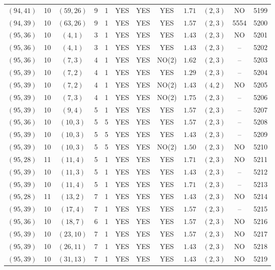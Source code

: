 \begin{longtable}{|c|c|c|c|c|c|c|c|c|c|c|c|}
$(94,41)$ & 10 & $(59,26)$ & 9 & 1 & YES & YES & YES & $1.71$ & $(2,3)$ & NO & 5199\\
$(94,39)$ & 10 & $(63,26)$ & 9 & 1 & YES & YES & YES & $1.57$ & $(2,3)$ & 5554 & 5200\\
$(95,36)$ & 10 & $(4,1)$ & 3 & 1 & YES & YES & YES & $1.43$ & $(2,3)$ & NO & 5201\\
$(95,36)$ & 10 & $(4,1)$ & 3 & 1 & YES & YES & YES & $1.43$ & $(2,3)$ & -- & 5202\\
$(95,36)$ & 10 & $(7,3)$ & 4 & 1 & YES & YES & NO(2) & $1.62$ & $(2,3)$ & -- & 5203\\
$(95,39)$ & 10 & $(7,2)$ & 4 & 1 & YES & YES & YES & $1.29$ & $(2,3)$ & -- & 5204\\
$(95,39)$ & 10 & $(7,2)$ & 4 & 1 & YES & YES & NO(2) & $1.43$ & $(4,2)$ & NO & 5205\\
$(95,39)$ & 10 & $(7,3)$ & 4 & 1 & YES & YES & NO(2) & $1.75$ & $(2,3)$ & -- & 5206\\
$(95,39)$ & 10 & $(9,4)$ & 5 & 1 & YES & YES & YES & $1.57$ & $(2,3)$ & -- & 5207\\
$(95,36)$ & 10 & $(10,3)$ & 5 & 5 & YES & YES & YES & $1.57$ & $(2,3)$ & -- & 5208\\
$(95,39)$ & 10 & $(10,3)$ & 5 & 5 & YES & YES & YES & $1.43$ & $(2,3)$ & -- & 5209\\
$(95,39)$ & 10 & $(10,3)$ & 5 & 5 & YES & YES & NO(2) & $1.50$ & $(2,3)$ & NO & 5210\\
$(95,28)$ & 11 & $(11,4)$ & 5 & 1 & YES & YES & YES & $1.71$ & $(2,3)$ & NO & 5211\\
$(95,39)$ & 10 & $(11,3)$ & 5 & 1 & YES & YES & YES & $1.43$ & $(2,3)$ & -- & 5212\\
$(95,39)$ & 10 & $(11,4)$ & 5 & 1 & YES & YES & YES & $1.71$ & $(2,3)$ & -- & 5213\\
$(95,28)$ & 11 & $(13,2)$ & 7 & 1 & YES & YES & YES & $1.43$ & $(2,3)$ & NO & 5214\\
$(95,39)$ & 10 & $(17,4)$ & 7 & 1 & YES & YES & YES & $1.57$ & $(2,3)$ & -- & 5215\\
$(95,36)$ & 10 & $(18,7)$ & 6 & 1 & YES & YES & YES & $1.57$ & $(2,3)$ & NO & 5216\\
$(95,39)$ & 10 & $(23,10)$ & 7 & 1 & YES & YES & YES & $1.57$ & $(2,3)$ & NO & 5217\\
$(95,39)$ & 10 & $(26,11)$ & 7 & 1 & YES & YES & YES & $1.43$ & $(2,3)$ & NO & 5218\\
$(95,39)$ & 10 & $(31,13)$ & 7 & 1 & YES & YES & YES & $1.43$ & $(2,3)$ & NO & 5219\\

\end{longtable}
